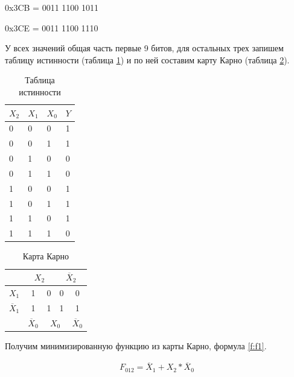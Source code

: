 \documentclass[a4paper,14pt]{article}
\begin{document}
0x3CB = 0011 1100 1011

0x3CE = 0011 1100 1110

У всех значений общая часть первые 9 битов, для остальных трех запишем таблицу истинности (таблица \ref{tab:ist}) и по ней составим карту Карно (таблица \ref{tab:karno}).

\begin{table}[H]
	\caption{Таблица истинности}	
	\label{tab:ist}
	\begin{center}
		\begin{tabular}{|l|l|l|l|}
			\hline
			$X_2$ & $X_1$ & $X_0$ & $Y$ \\ \hline
			0 & 0 & 0 & 1 \\ \hline
			0 & 0 & 1 & 1 \\ \hline
			0 & 1 & 0 & 0 \\ \hline
			0 & 1 & 1 & 0 \\ \hline
			1 & 0 & 0 & 1 \\ \hline
			1 & 0 & 1 & 1 \\ \hline
			1 & 1 & 0 & 1 \\ \hline
			1 & 1 & 1 & 0 \\ \hline
		\end{tabular}
	\end{center}
\end{table}

\begin{table}[H]
	\caption{Карта Карно}	
	\label{tab:karno}
	\begin{center}
		\begin{tabular}{c|c|c|c|c|}
			& \multicolumn{2}{c|}{$X_2$}     & \multicolumn{2}{c|}{$\overline X_2$}    \\ \hline
			$X_1$           & 1                 & 0        & 0             & 0                     \\ \hline
			$\overline X_1$ & 1                 & 1        & 1             & 1                     \\ \hline
			& $\overline X_0$     & \multicolumn{2}{c|}{$X_0$} & $\overline X_0$        
		\end{tabular}
	\end{center}
\end{table}

Получим минимизированную функцию из карты Карно, формула \ref{f:f1}.

\begin{equation}
\label{f:f1}
\begin{gathered}
F_{012} = \overline X_1 + X_2 * \overline X_0 
\end{gathered}
\end{equation}
\end{document}
